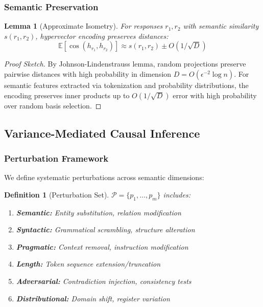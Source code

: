 \documentclass[11pt,a4paper]{article}
\newtheorem{lemma}[theorem]{Lemma}
\newtheorem{definition}{Definition}
\newcommand{\E}{\mathbb{E}}
\begin{document}
\subsubsection{Semantic Preservation}

\begin{lemma}[Approximate Isometry]
For responses $r_1, r_2$ with semantic similarity $s(r_1, r_2)$, hypervector encoding preserves distances:
\begin{equation}
\E[\cos(h_{r_1}, h_{r_2})] \approx s(r_1, r_2) \pm O(1/\sqrt{D})
\end{equation}
\end{lemma}

\begin{proof}[Proof Sketch]
By Johnson-Lindenstrauss lemma, random projections preserve pairwise distances with high probability in dimension $D = O(\epsilon^{-2} \log n)$. For semantic features extracted via tokenization and probability distributions, the encoding preserves inner products up to $O(1/\sqrt{D})$ error with high probability over random basis selection.
\end{proof}

\subsection{Variance-Mediated Causal Inference}

\subsubsection{Perturbation Framework}

We define systematic perturbations across semantic dimensions:

\begin{definition}[Perturbation Set]
$\mathcal{P} = \{p_1, \ldots, p_m\}$ includes:
\begin{enumerate}
\item \textbf{Semantic:} Entity substitution, relation modification
\item \textbf{Syntactic:} Grammatical scrambling, structure alteration
\item \textbf{Pragmatic:} Context removal, instruction modification
\item \textbf{Length:} Token sequence extension/truncation
\item \textbf{Adversarial:} Contradiction injection, consistency tests
\item \textbf{Distributional:} Domain shift, register variation
\end{enumerate}
\end{definition}
\end{document}

